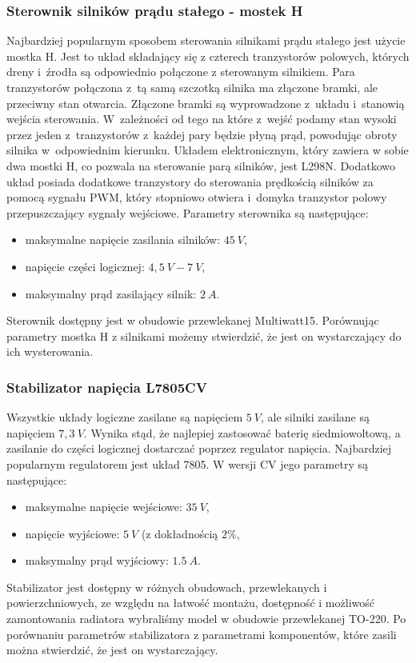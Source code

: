\documentclass[11pt]{article}
\begin{document}
\subsubsection{Sterownik silników prądu stałego -  mostek H}
Najbardziej popularnym sposobem sterowania silnikami prądu stałego jest użycie mostka H.
Jest to układ składający się z czterech tranzystorów polowych, których dreny i~źrodła są odpowiednio połączone z sterowanym silnikiem. Para tranzystorów połączona z~tą samą szczotką silnika ma złączone bramki, ale przeciwny stan otwarcia.
Złączone bramki są wyprowadzone z~układu i~stanowią wejścia sterowania. W~zależności od tego na które z~wejść podamy stan wysoki przez jeden z~tranzystorów z~każdej pary będzie płyną prąd, powodując obroty silnika w~odpowiednim kierunku.
Układem elektronicznym, który zawiera w sobie dwa mostki H, co pozwala na sterowanie parą silników, jest L298N.
Dodatkowo układ posiada dodatkowe tranzystory do sterowania prędkością silników za pomocą sygnału PWM, który stopniowo otwiera i~domyka tranzystor polowy przepuszczający sygnały wejściowe. Parametry sterownika są następujące:
\begin{itemize}
	\item maksymalne napięcie zasilania silników: $ 45\ V $,
	\item napięcie części logicznej: $ 4,5\ V - 7\ V $,
	\item maksymalny prąd zasilający silnik: $ 2\ A $.
\end{itemize}
Sterownik dostępny jest w obudowie przewlekanej Multiwatt15. Porównując parametry mostka H z silnikami możemy stwierdzić, że jest on wystarczający do ich wysterowania.

\subsubsection{Stabilizator napięcia L7805CV}
Wszystkie układy logiczne zasilane są napięciem $ 5\ V $, ale silniki zasilane są napięciem $ 7,3\ V $. 
Wynika stąd, że najlepiej zastosować baterię siedmiowoltową, a zasilanie do części logicznej dostarczać poprzez regulator napięcia. Najbardziej popularnym regulatorem jest układ 7805. 
W wersji CV jego parametry są następujące:
\begin{itemize}
	\item maksymalne napięcie wejściowe: $ 35\ V $,
	\item napięcie wyjściowe: $ 5\ V $ (z dokładnością $ 2\% $,
	\item maksymalny prąd wyjściowy: $ 1.5\ A $.
\end{itemize}
Stabilizator jest dostępny w różnych obudowach, przewlekanych i powierzchniowych, ze względu na łatwość montażu, dostępność i możliwość zamontowania radiatora wybraliśmy model w obudowie przewlekanej TO-220.
Po porównaniu parametrów stabilizatora z parametrami komponentów, które zasili można stwierdzić, że jest on wystarczający.
\end{document}
